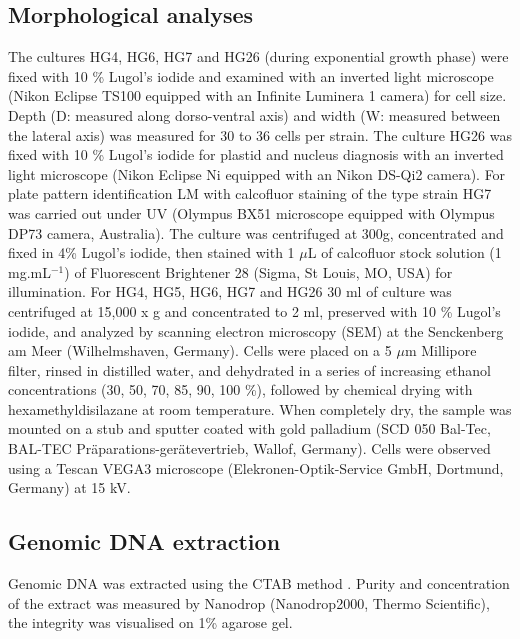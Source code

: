 \documentclass[12pt]{article}
\begin{document}
\subsection{Morphological analyses}
The cultures HG4, HG6, HG7 and HG26 (during exponential growth phase) were fixed with 10 \% Lugol's iodide and examined with an inverted light microscope (Nikon Eclipse TS100 equipped with an Infinite Luminera 1 camera) for cell size. 
Depth (D: measured along dorso-ventral axis) and width (W: measured between the lateral axis) was measured for 30 to 36 cells per strain.
The culture HG26 was fixed with 10 \% Lugol's iodide for plastid and nucleus diagnosis with an inverted light microscope (Nikon Eclipse Ni equipped with an Nikon DS-Qi2 camera).
For plate pattern identification LM with calcofluor staining of the type strain HG7 was carried out under UV (Olympus BX51 microscope equipped with Olympus DP73 camera, Australia). 
The culture was centrifuged at 300g, concentrated and fixed in 4\% Lugol’s iodide, then stained with 1 $\mu$L of calcofluor stock solution (1 mg.mL$^{-1}$) of Fluorescent Brightener 28 (Sigma, St Louis, MO, USA) for illumination.
For HG4, HG5, HG6, HG7 and HG26 30 ml of culture was centrifuged at 15,000 x g and concentrated to 2 ml, preserved with 10 \% Lugol's iodide, and analyzed by scanning electron microscopy (SEM) at the Senckenberg am Meer (Wilhelmshaven, Germany). 
Cells were placed on a 5 $\mu$m Millipore filter, rinsed in distilled water, and dehydrated in a series of increasing ethanol concentrations (30, 50, 70, 85, 90, 100 \%), followed by chemical drying with hexamethyldisilazane at room temperature. 
When completely dry, the sample was mounted on a stub and sputter coated with gold palladium (SCD 050 Bal-Tec, BAL-TEC Pr\"aparations-ger\" atevertrieb, Wallof, Germany). 
Cells were observed using a Tescan VEGA3 microscope (Elekronen-Optik-Service GmbH, Dortmund, Germany) at 15 kV.

\subsection{Genomic DNA extraction}
Genomic DNA was extracted using the CTAB method \citep{zhou1999analysis}. 
Purity and concentration of the extract was measured by Nanodrop (Nanodrop2000, Thermo Scientific), the integrity was visualised on 1\% agarose gel.
\end{document}
